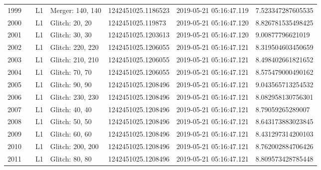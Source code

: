 \begin{longtable}{lllllll}
1999 &                                                    &       L1 &  Merger: 140, 140 &  1242451025.1186523 &  2019-05-21 05:16:47.119 &   7.523347287605535 \\
2000 &                                                    &       L1 &    Glitch: 20, 20 &   1242451025.119873 &  2019-05-21 05:16:47.120 &   8.826781535498425 \\
2001 &                                                    &       L1 &    Glitch: 30, 30 &  1242451025.1203613 &  2019-05-21 05:16:47.120 &    9.00877796621019 \\
2002 &                                                    &       L1 &  Glitch: 220, 220 &  1242451025.1206055 &  2019-05-21 05:16:47.121 &   8.319504603450659 \\
2003 &                                                    &       L1 &  Glitch: 210, 210 &  1242451025.1206055 &  2019-05-21 05:16:47.121 &   8.498402661821652 \\
2004 &                                                    &       L1 &    Glitch: 70, 70 &  1242451025.1206055 &  2019-05-21 05:16:47.121 &   8.575479000490162 \\
2005 &                                                    &       L1 &    Glitch: 90, 90 &  1242451025.1208496 &  2019-05-21 05:16:47.121 &   9.043565713254532 \\
2006 &                                                    &       L1 &  Glitch: 230, 230 &  1242451025.1208496 &  2019-05-21 05:16:47.121 &   8.082958130756301 \\
2007 &                                                    &       L1 &    Glitch: 40, 40 &  1242451025.1208496 &  2019-05-21 05:16:47.121 &    8.79059265289007 \\
2008 &                                                    &       L1 &    Glitch: 50, 50 &  1242451025.1208496 &  2019-05-21 05:16:47.121 &   8.643173883023845 \\
2009 &                                                    &       L1 &    Glitch: 60, 60 &  1242451025.1208496 &  2019-05-21 05:16:47.121 &   8.431297314200103 \\
2010 &                                                    &       L1 &  Glitch: 200, 200 &  1242451025.1208496 &  2019-05-21 05:16:47.121 &   8.762002884706426 \\
2011 &                                                    &       L1 &    Glitch: 80, 80 &  1242451025.1208496 &  2019-05-21 05:16:47.121 &   8.809573428785448 \\

\end{longtable}
